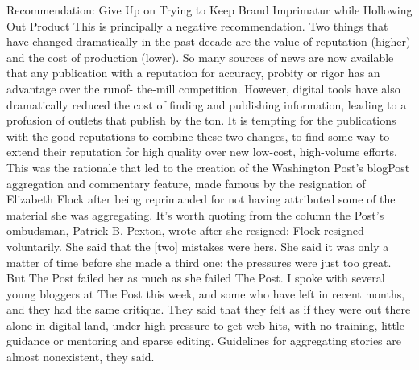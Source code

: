 Recommendation: Give Up on Trying to Keep Brand Imprimatur while
Hollowing Out Product
This is principally a negative recommendation.
Two things that have changed dramatically in the past decade are the
value of reputation (higher) and the cost of production (lower). So
many sources of news are now available that any publication with a
reputation for accuracy, probity or rigor has an advantage over the runof-
the-mill competition. However, digital tools have also dramatically
reduced the cost of finding and publishing information, leading to a
profusion of outlets that publish by the ton.
It is tempting for the publications with the good reputations to combine
these two changes, to find some way to extend their reputation
for high quality over new low-cost, high-volume efforts. This was the
rationale that led to the creation of the Washington Post’s blogPost aggregation
and commentary feature, made famous by the resignation of
Elizabeth Flock after being reprimanded for not having attributed some
of the material she was aggregating.
It’s worth quoting from the column the Post’s ombudsman, Patrick B.
Pexton, wrote after she resigned:
Flock resigned voluntarily. She said that the [two] mistakes were
hers. She said it was only a matter of time before she made a third
one; the pressures were just too great.
But The Post failed her as much as she failed The Post. I spoke with
several young bloggers at The Post this week, and some who have
left in recent months, and they had the same critique.
They said that they felt as if they were out there alone in digital
land, under high pressure to get web hits, with no training, little
guidance or mentoring and sparse editing. Guidelines for aggregating
stories are almost nonexistent, they said.


